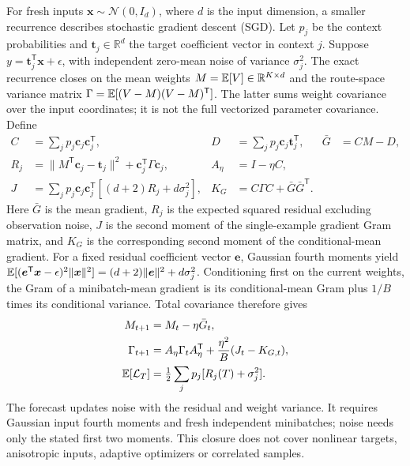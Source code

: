 For fresh inputs $\bm x\sim\mathcal N(0,I_d)$, where $d$ is the input
dimension, a smaller recurrence describes stochastic gradient descent (SGD).
Let $p_j$ be the context probabilities and $\bm t_j\in\mathbb R^d$ the
target coefficient vector in context $j$. Suppose
$y=\bm t_j^{\mathsf T}\bm x+\epsilon$, with independent zero-mean noise
of variance $\sigma_j^2$. The exact recurrence closes on the mean weights
$M=\mathbb{E}[V]\in\mathbb R^{K\times d}$ and the route-space variance matrix
$\Gamma=\mathbb{E}[(V-M)(V-M)^{\mathsf T}]$. The latter sums weight covariance
over the input coordinates; it is not the full vectorized parameter
covariance. Define
\begin{align}
 C&=\sum_jp_j\bm c_j\bm c_j^{\mathsf T},&
 D&=\sum_jp_j\bm c_j\bm t_j^{\mathsf T},&
 \bar G&=CM-D,\\
 R_j&=\|M^{\mathsf T}\bm c_j-\bm t_j\|^2+
                    \bm c_j^{\mathsf T}\Gamma\bm c_j,&
 A_\eta&=I-\eta C,\\
 J&=\sum_jp_j\bm c_j\bm c_j^{\mathsf T}
                  [(d+2)R_j+d\sigma_j^2],&
 K_G&=C\Gamma C+\bar G\bar G^{\mathsf T}.
\end{align}
Here $\bar G$ is the mean gradient, $R_j$ is the expected squared residual
excluding observation noise, $J$ is the second moment of the single-example
gradient Gram matrix, and $K_G$ is the corresponding second moment of the
conditional-mean gradient. For a fixed residual coefficient vector
$\bm e$, Gaussian fourth moments yield
$\mathbb{E}[(\bm e^{\mathsf T}\bm x-\epsilon)^2\|\bm x\|^2]
=(d+2)\|\bm e\|^2+d\sigma_j^2$. Conditioning first on the current
weights, the Gram of a minibatch-mean gradient is its conditional-mean Gram
plus $1/B$ times its conditional variance. Total covariance therefore gives
\begin{align}
 M_{t+1}&=M_t-\eta\bar G_t,\\
 \Gamma_{t+1}&=A_\eta\Gamma_t A_\eta^{\mathsf T}
                      +\frac{\eta^2}{B}(J_t-K_{G,t}),
 \label{eq:s_fresh_sgd_moments}\\
 \mathbb{E}[\mathcal L_T]&=\tfrac12\sum_jp_j[R_j(T)+\sigma_j^2].
\end{align}
The forecast updates noise with the residual and weight variance. It requires Gaussian input fourth moments and fresh independent minibatches; noise needs only the stated first two moments. This closure does not cover nonlinear targets, anisotropic inputs, adaptive optimizers or correlated samples.

